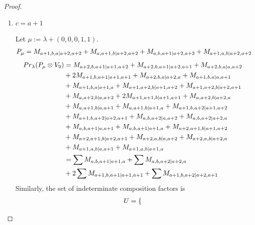 \begin{proof}
\begin{enumerate}
\begin{enumerate}
      \item $c=a+1$ \par
        Let $\mu:=\lambda + (0,0,0,1,1) $.
        \begin{equation}\notag
          \begin{aligned}
            P_\mu = M_{a+1,b,a|a+2,a+2}
+ M_{a,a+1,b|a+2,a+2}
+ M_{a,b,a+1|a+2,a+2}
+ M_{a+1,a,b|a+2,a+2}
          \end{aligned}
        \end{equation}
        \begin{equation}\notag
          \begin{aligned}
            Pr_{\lambda}(P_\mu \otimes V_{9}) &=
M_{a+2,b,a+1|a+1,a+2}
+ M_{a+2,b,a+1|a+2,a+1}
+ M_{a+2,b,a|a,a+2}\\ 
                                              &
+ 2M_{a+1,b,a+1|a+1,a+1}
+ M_{a+2,b,a|a+2,a}
+ M_{a+1,b,a|a,a+1}\\ 
                                              &
+ M_{a+1,b,a|a+1,a}
+ M_{a+1,a+2,b|a+1,a+2}
+ M_{a+1,a+2,b|a+2,a+1}\\ 
                                              &
+ M_{a,a+2,b|a,a+2}
+ 2M_{a+1,a+1,b|a+1,a+1}
+ M_{a,a+2,b|a+2,a}\\ 
                                              &
+ M_{a,a+1,b|a,a+1}
+ M_{a,a+1,b|a+1,a}
+ M_{a+1,b,a+2|a+1,a+2}\\ 
                                              &
+ M_{a+1,b,a+2|a+2,a+1}
+ M_{a,b,a+2|a,a+2}
+ M_{a,b,a+2|a+2,a}\\ 
                                              &
+ M_{a,b,a+1|a,a+1}
+ M_{a,b,a+1|a+1,a}
+ M_{a+2,a+1,b|a+1,a+2}\\ 
                                              &
+ M_{a+2,a+1,b|a+2,a+1}
+ M_{a+2,a,b|a,a+2}
+ M_{a+2,a,b|a+2,a}\\ 
                                              &
+ M_{a+1,a,b|a,a+1}
+ M_{a+1,a,b|a+1,a} \\
                                               &=
\sum M_{a,b,a+1|a+1,a}
+ \sum M_{a,b,a+2|a+2,a}\\ 
                                              &
+ 2\sum M_{a+1,b,a+1|a+1,a+1}
+ \sum M_{a+1,b,a+2|a+2,a+1}
          \end{aligned}
        \end{equation}
      Similarly, the set of indeterminate composition factors is 
\begin{equation}\notag
  \begin{aligned}
     U = \{

\end{aligned}
\end{equation}
\end{enumerate}
\end{enumerate}
\end{proof}
